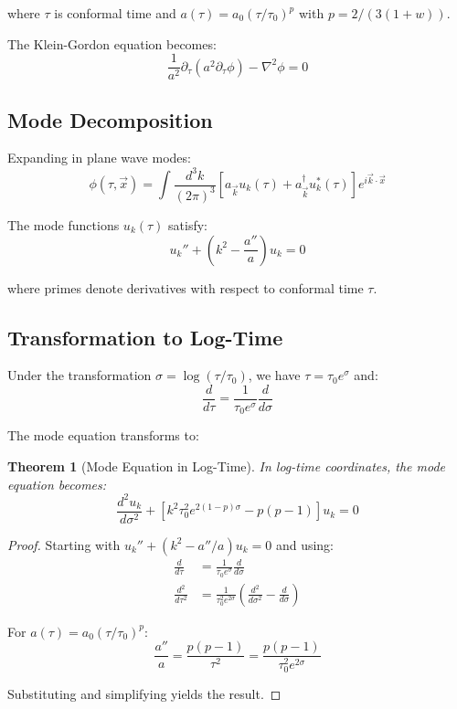 \documentclass[11pt,a4paper]{article}
\newtheorem{theorem}{Theorem}[section]
\begin{document}
where $\tau$ is conformal time and $a(\tau) = a_0 (\tau/\tau_0)^p$ with $p = 2/(3(1+w))$.

The Klein-Gordon equation becomes:
\begin{equation}
\frac{1}{a^2} \partial_\tau \left(a^2 \partial_\tau \phi\right) - \nabla^2 \phi = 0
\end{equation}

\subsection{Mode Decomposition}

Expanding in plane wave modes:
\begin{equation}
\phi(\tau, \vec{x}) = \int \frac{d^3k}{(2\pi)^3} \left[a_{\vec{k}} u_k(\tau) + a^\dagger_{\vec{k}} u_k^*(\tau)\right] e^{i\vec{k} \cdot \vec{x}}
\end{equation}

The mode functions $u_k(\tau)$ satisfy:
\begin{equation}
u_k'' + \left(k^2 - \frac{a''}{a}\right) u_k = 0
\end{equation}

where primes denote derivatives with respect to conformal time $\tau$.

\subsection{Transformation to Log-Time}

Under the transformation $\sigma = \log(\tau/\tau_0)$, we have $\tau = \tau_0 e^{\sigma}$ and:
\begin{equation}
\frac{d}{d\tau} = \frac{1}{\tau_0 e^{\sigma}} \frac{d}{d\sigma}
\end{equation}

The mode equation transforms to:

\begin{theorem}[Mode Equation in Log-Time]
In log-time coordinates, the mode equation becomes:
\begin{equation}
\frac{d^2 u_k}{d\sigma^2} + \left[k^2 \tau_0^2 e^{2(1-p)\sigma} - p(p-1)\right] u_k = 0
\end{equation}
\end{theorem}

\begin{proof}
Starting with $u_k'' + (k^2 - a''/a) u_k = 0$ and using:
\begin{align}
\frac{d}{d\tau} &= \frac{1}{\tau_0 e^{\sigma}} \frac{d}{d\sigma} \\
\frac{d^2}{d\tau^2} &= \frac{1}{\tau_0^2 e^{2\sigma}} \left(\frac{d^2}{d\sigma^2} - \frac{d}{d\sigma}\right)
\end{align}

For $a(\tau) = a_0 (\tau/\tau_0)^p$:
\begin{equation}
\frac{a''}{a} = \frac{p(p-1)}{\tau^2} = \frac{p(p-1)}{\tau_0^2 e^{2\sigma}}
\end{equation}

Substituting and simplifying yields the result.
\end{proof}
\end{document}
